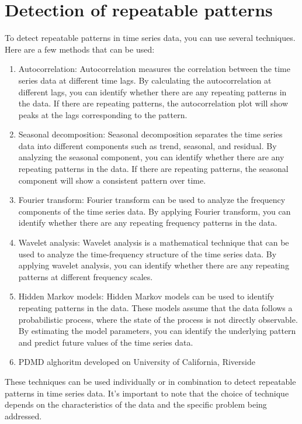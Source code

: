     \section{Detection of repeatable patterns}
    To detect repeatable patterns in time series data, you can use several techniques. Here are a few methods that can be used:
    \begin{enumerate}
        \item Autocorrelation: Autocorrelation measures the correlation between the time series data at different time lags.
        By calculating the autocorrelation at different lags, you can identify whether there are any repeating patterns in the data.
        If there are repeating patterns, the autocorrelation plot will show peaks at the lags corresponding to the pattern.
        \item Seasonal decomposition: Seasonal decomposition separates the time series data into different components such as trend,
        seasonal, and residual. By analyzing the seasonal component, you can identify whether there are any repeating patterns in the data.
        If there are repeating patterns, the seasonal component will show a consistent pattern over time.
        \item Fourier transform: Fourier transform can be used to analyze the frequency components of the time series data. By applying
        Fourier transform, you can identify whether there are any repeating frequency patterns in the data.
        \item Wavelet analysis: Wavelet analysis is a mathematical technique that can be used to analyze the time-frequency
        structure of the time series data. By applying wavelet analysis, you can identify whether there are any repeating patterns at different
        frequency scales.
        \item Hidden Markov models: Hidden Markov models can be used to identify repeating patterns in the data.
        These models assume that the data follows a probabilistic process, where the state of the process is not directly observable.
        By estimating the model parameters, you can identify the underlying pattern and predict future values of the time series data.
        \item PDMD alghoritm developed on University of California, Riverside
    \end{enumerate}
    These techniques can be used individually or in combination to detect repeatable patterns in time series data.
    It's important to note that the choice of technique depends on the characteristics of the data and the specific problem being addressed.
